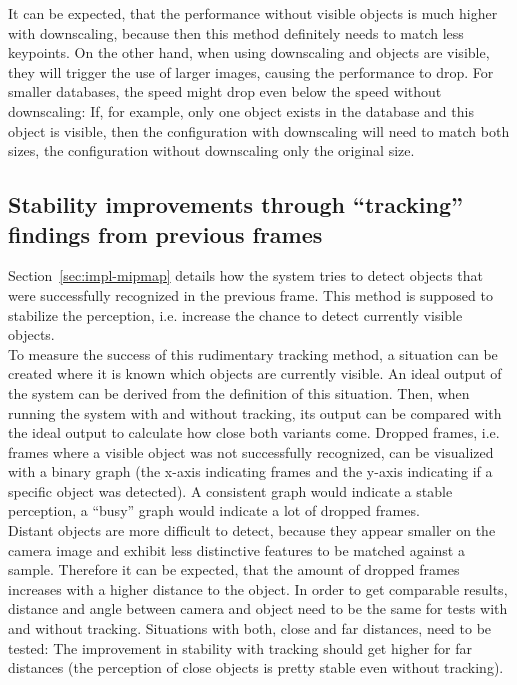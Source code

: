 It can be expected, that the performance without visible objects is much higher with downscaling, because then this method definitely needs to match less keypoints. On the other hand, when using downscaling and objects are visible, they will trigger the use of larger images, causing the performance to drop. For smaller databases, the speed might drop even below the speed without downscaling: If, for example, only one object exists in the database and this object is visible, then the configuration with downscaling will need to match both sizes, the configuration without downscaling only the original size.


\subsection{Stability improvements through ``tracking'' findings from previous frames}
\label{sec:analysis-tracking}
Section~\ref{sec:impl-mipmap} details how the system tries to detect objects that were successfully recognized in the previous frame. This method is supposed to stabilize the perception, i.e. increase the chance to detect currently visible objects. \\

To measure the success of this rudimentary tracking method, a situation can be created where it is known which objects are currently visible. An ideal output of the system can be derived from the definition of this situation. Then, when running the system with and without tracking, its output can be compared with the ideal output to calculate how close both variants come. Dropped frames, i.e. frames where a visible object was not successfully recognized, can be visualized with a binary graph (the x-axis indicating frames and the y-axis indicating if a specific object was detected). A consistent graph would indicate a stable perception, a ``busy'' graph would indicate a lot of dropped frames. \\

Distant objects are more difficult to detect, because they appear smaller on the camera image and exhibit less distinctive features to be matched against a sample. Therefore it can be expected, that the amount of dropped frames increases with a higher distance to the object. In order to get comparable results, distance and angle between camera and object need to be the same for tests with and without tracking. Situations with both, close and far distances, need to be tested: The improvement in stability with tracking should get higher for far distances (the perception of close objects is pretty stable even without tracking).


